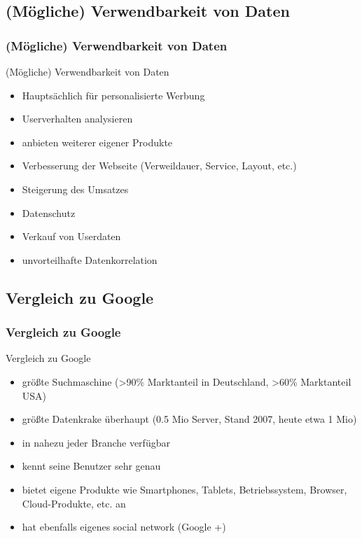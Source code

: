 \documentclass[xcolor=dvipsnames]{beamer}
\begin{document}
\subsection{(Mögliche) Verwendbarkeit von Daten}
\begin{frame} %
  \frametitle{(Mögliche) Verwendbarkeit von Daten} %
  \begin{block}{(Mögliche) Verwendbarkeit von Daten}
	  \begin{itemize}
	  	\item Hauptsächlich für personalisierte Werbung
		\item Userverhalten analysieren
		\item anbieten weiterer eigener Produkte
		\item Verbesserung der Webseite (Verweildauer, Service, Layout, etc.)
		\item Steigerung des Umsatzes
	  \end{itemize}
  \end{block}
  \begin{alertblock}{}
	  \begin{itemize}
		\item Datenschutz
		\item Verkauf von Userdaten
		\item unvorteilhafte Datenkorrelation
	  \end{itemize}
  \end{alertblock}
\end{frame}

\subsection{Vergleich zu Google}
\begin{frame} %
  \frametitle{Vergleich zu Google} %
  \begin{block}{Vergleich zu Google}
	  \begin{itemize}
	  	\item größte Suchmaschine (>90\% Marktanteil in Deutschland, >60\% Marktanteil USA)
		\item größte Datenkrake überhaupt (0.5 Mio Server, Stand 2007, heute etwa 1 Mio)
		\item in nahezu jeder Branche verfügbar
		\item kennt seine Benutzer sehr genau
		\item bietet eigene Produkte wie Smartphones, Tablets, Betriebssystem, Browser, Cloud-Produkte, etc. an
		\item hat ebenfalls eigenes social network (Google +)
	  \end{itemize}
  \end{block}
\end{frame}
\end{document}
